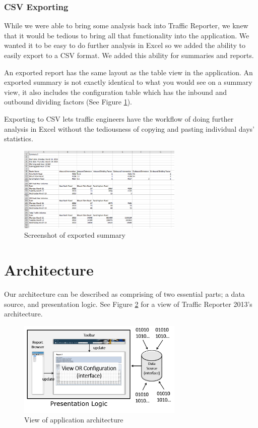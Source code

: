 \documentclass{article}
\begin{document}
\subsubsection{CSV Exporting}
While we were able to bring some analysis back into Traffic Reporter, we knew that it would be tedious to bring all that functionality into the application. We wanted it to be easy to do further analysis in Excel so we added the ability to easily export to a CSV format. We added this ability for summaries and reports. 

An exported report has the same layout as the table view in the application. An exported summary is not exactly identical to what you would see on a summary view, it also includes the configuration table which has the inbound and outbound dividing factors (See Figure \ref{fig:summaryCSV}).

Exporting to CSV lets traffic engineers have the workflow of doing further analysis in Excel without the tediousness of copying and pasting individual days' statistics. 

\begin{figure}[!t]
\centerline{\includegraphics[width=3.1in]{summaryCSV}}
\caption{Screenshot of exported summary}
\label{fig:summaryCSV}
\end{figure}

\section{Architecture}
Our architecture can be described as comprising of two essential parts; a data source, and presentation logic. See Figure \ref{fig:architecture} for a view of Traffic Reporter 2013's architecture.

\begin{figure}[!b]
\centerline{\includegraphics[width=3.1in]{architecture}}
\caption{View of application architecture}
\label{fig:architecture}
\end{figure}
\end{document}
